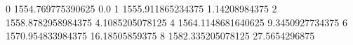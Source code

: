 0 1554.769775390625 0.0
1 1555.911865234375 1.14208984375
2 1558.8782958984375 4.1085205078125
4 1564.1148681640625 9.3450927734375
6 1570.954833984375 16.18505859375
8 1582.335205078125 27.5654296875

